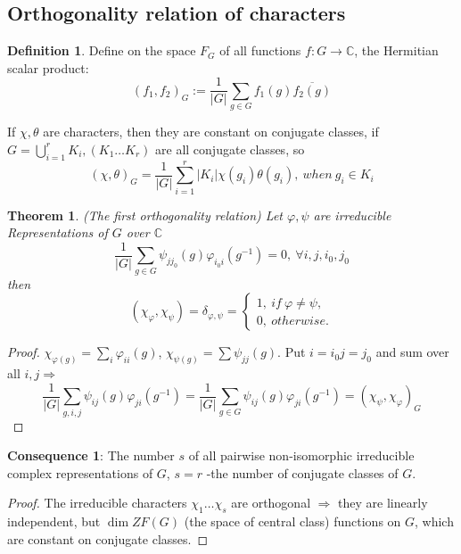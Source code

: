 \documentclass[12pt, a4paper]{article}
\newtheorem{theorem}{Theorem}[section]
\theoremstyle{definition}
\newtheorem{definition}{Definition}[section]
\begin{document}
\subsection{Orthogonality relation of characters}
\begin{definition}
    Define on the space $F_G$ of all functions $f:G\rightarrow \mathbb{C}$, the Hermitian 
    scalar product: 
    \[{(f_1, f_2)}_G := \frac1{|G|}\sum_{g\in G} f_1(g)\overline{f_2(g)}\]
\end{definition}
\par
If $\chi, \theta$ are characters, then they are constant on conjugate classes, if $G = 
\bigcup_{i=1}^{r} K_i, (K_1\ldots K_r)$ are all conjugate classes, so
\[{(\chi,\theta)}_G = \frac1{|G|}\sum_{i=1}^{r}|K_i|\chi(g_i)\theta(g_i),\ when\ g_i\in K_i\]
\begin{theorem}
    (The first orthogonality relation) Let $\varphi, \psi$ are irreducible Representations
    of $G$ over $\mathbb{C}$
    \[\frac1{|G|}\sum_{g\in G} \psi_{jj_0}(g)\varphi_{i_0i}(g^{-1}) = 0,\ \forall i,j,i_0,
    j_0 \]
    then 
    \[
        (\chi_\varphi, \chi_\psi) = \delta_{\varphi,\psi} = 
        \begin{cases}
            1,\ if\ \varphi \neq \psi, \\
            0,\ otherwise.
        \end{cases}
    \]
\end{theorem}
\begin{proof}
    $\chi_{\varphi(g)} = \sum_i\varphi_{ii}(g)$, $\chi_{\psi(g)} = \sum\psi_{jj}(g)$.
    Put  $i = i_0j = j_0$ and sum over all $i,j \Rightarrow$
    \[
        \frac1{|G|}\sum_{g,i,j}\psi_{ij}(g)\varphi_{ji}(g^{-1}) = \frac1{|G|}\sum_{g\in G}
        \psi_{ij}(g)\varphi_{ji}(g^{-1}) = {(\chi_\psi,\chi_\varphi)}_G
    \]
\end{proof}
\par
\textbf{Consequence 1}: The number $s$ of all pairwise non-isomorphic irreducible complex
representations of $G$, $s = r$ -the number of conjugate classes of $G$.
\begin{proof}
    The irreducible characters $\chi_{1}\ldots\chi_{s}$ are orthogonal $\Rightarrow$ they
    are linearly independent, but $\dim ZF(G)$ (the space of central class) functions on 
    $G$, which are constant on conjugate classes.
    \par
\end{proof}

\newpage
\end{document}
